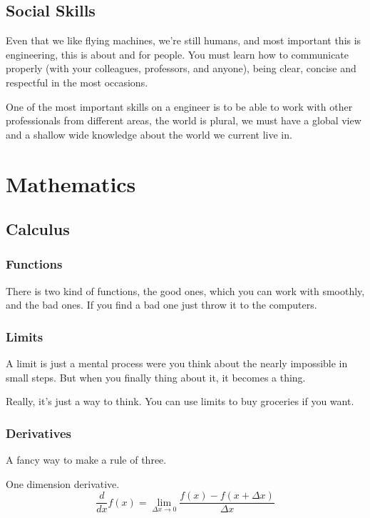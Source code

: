 \section{Social Skills}

Even that we like flying machines, we're still humans,
and most important this is engineering, this is about and for people.
You must learn how to communicate properly (with your colleagues,
professors, and anyone), being clear, concise and respectful in
the most occasions.

One of the most important skills on a engineer is to be able to
work with other professionals from different areas, the world
is plural, we must have a global view and a shallow wide knowledge
about the world we current live in.

\chapter{Mathematics}


\section{Calculus}
\subsection{Functions}

There is two kind of functions, the good ones, which you
can work with smoothly, and the bad ones. If you find a bad one
just throw it to the computers.

\subsection{Limits}

A limit is just a mental process were you think about the
nearly impossible in small steps.
But when you finally thing about it, it becomes a thing.

Really, it's just a way to think. You can use limits
to buy groceries if you want.

\subsection{Derivatives}

A fancy way to make a rule of three.

One dimension derivative.
$$\frac{d}{dx}f(x) = \lim_{\Delta x \to 0} \frac{f(x) - f(x+\Delta x)}{\Delta x}$$

